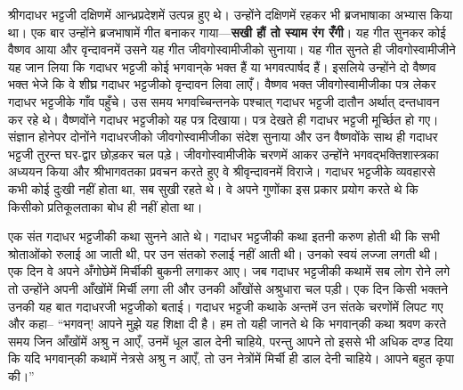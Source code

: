 \begin{sloppypar}\justifying{}
श्रीगदाधर भट्टजी दक्षिणमें आन्ध्रप्रदेशमें उत्पन्न हुए थे। उन्होंने दक्षिणमें रहकर भी ब्रजभाषाका अभ्यास किया था। एक बार उन्होंने ब्रजभाषामें गीत बनाकर गाया—\textbf{सखी हौं तो स्याम रंग रँगी}। यह गीत सुनकर कोई वैष्णव आया और वृन्दावनमें उसने यह गीत जीव\-गोस्वामीजीको सुनाया। यह गीत सुनते ही जीव\-गोस्वामीजीने यह जान लिया कि गदाधर भट्टजी कोई भगवान्‌के भक्त हैं या भगवत्पार्षद हैं। इसलिये उन्होंने दो वैष्णव भक्त भेजे कि वे शीघ्र गदाधर भट्टजीको वृन्दावन लिवा लाएँ। वैष्णव भक्त जीव\-गोस्वामीजीका पत्र लेकर गदाधर भट्टजीके गाँव पहुँचे। उस समय भगवच्चिन्तनके पश्चात् गदाधर भट्टजी दातौन अर्थात् दन्तधावन कर रहे थे। वैष्णवोंने गदाधर भट्टजीको यह पत्र दिखाया। पत्र देखते ही गदाधर भट्टजी मूर्च्छित हो गए। संज्ञान होनेपर दोनोंने गदाधरजीको जीव\-गोस्वामीजीका संदेश सुनाया और उन वैष्णवोंके साथ ही गदाधर भट्टजी तुरन्त घर-द्वार छोड़कर चल पड़े। जीव\-गोस्वामीजीके चरणमें आकर उन्होंने भगवद्भक्ति\-शास्त्रका अध्ययन किया और श्रीभागवतका प्रवचन करते हुए वे श्रीवृन्दावनमें विराजे। गदाधर भट्टजीके व्यवहारसे कभी कोई दुःखी नहीं होता था, सब सुखी रहते थे। वे अपने गुणोंका इस प्रकार प्रयोग करते थे कि किसीको प्रतिकूलताका बोध ही नहीं होता था।
\end{sloppypar}
\begin{sloppypar}\justifying{}
एक संत गदाधर भट्टजीकी कथा सुनने आते थे। गदाधर भट्टजीकी कथा इतनी करुण होती थी कि सभी श्रोताओंको रुलाई आ जाती थी, पर उन संतको रुलाई नहीं आती थी। उनको स्वयं लज्जा लगती थी। एक दिन वे अपने अँगोछेमें मिर्चीकी बुकनी लगाकर आए। जब गदाधर भट्टजीकी कथामें सब लोग रोने लगे तो उन्होंने अपनी आँखोंमें मिर्ची लगा ली और उनकी आँखोंसे अश्रुधारा चल पड़ी। एक दिन किसी भक्तने उनकी यह बात गदाधरजी भट्टजीको बताई। गदाधर भट्टजी कथाके अन्तमें उन संतके चरणोंमें लिपट गए और कहा– “भगवन्! आपने मुझे यह शिक्षा दी है। हम तो यही जानते थे कि भगवान्‌की कथा श्रवण करते समय जिन आँखोंमें अश्रु न आएँ, उनमें धूल डाल देनी चाहिये, परन्तु आपने तो इससे भी अधिक दण्ड दिया कि यदि भगवान्‌की कथामें नेत्रसे अश्रु न आएँ, तो उन नेत्रोंमें मिर्ची ही डाल देनी चाहिये। आपने बहुत कृपा की।”
\end{sloppypar}

